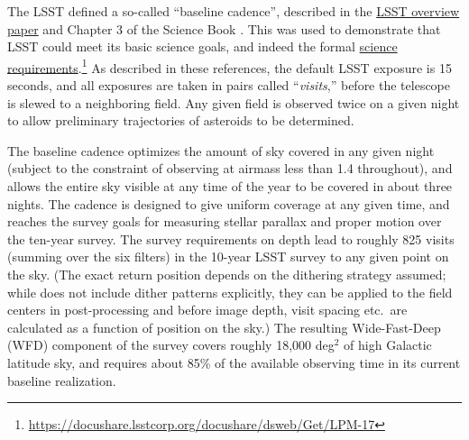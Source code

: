 The LSST defined a so-called ``baseline cadence'', described in the
\href{http://adsabs.harvard.edu/abs/2008arXiv0805.2366I}{LSST overview
paper} \citep{IvezicEtal2008} and Chapter 3 of the Science Book \citep{2009arXiv0912.0201L}.  This was used
to demonstrate that LSST could meet its basic science goals, and indeed
the formal
\href{https://docushare.lsstcorp.org/docushare/dsweb/Get/LPM-17}{science
requirements}.\footnote{\url{https://docushare.lsstcorp.org/docushare/dsweb/Get/LPM-17}}    As described in these references, the default LSST
exposure is 15 seconds, and all exposures are taken in pairs called  ``{\em visits},'' before the telescope is slewed to a neighboring field.
Any given field is observed twice on a given night to allow
preliminary trajectories of asteroids to be determined.

The baseline cadence optimizes the amount of sky covered in any given
night (subject to the constraint of observing at airmass less than 1.4
throughout), and allows the entire sky visible at any time of the year
to be covered in about three nights.  The cadence is designed to give
uniform coverage at any given time, and reaches the survey goals for
measuring stellar parallax and proper motion over the ten-year survey.
The survey requirements on depth lead to roughly 825 visits (summing
over the six filters) in the 10-year LSST survey to any given point on
the sky.  (The exact return position depends on the dithering strategy assumed; while \OpSim does not include dither patterns explicitly, they can be applied to the field centers in post-processing and before image depth, visit spacing etc.\ are calculated as a function of position on the sky.) The resulting Wide-Fast-Deep (WFD) component of the survey covers
roughly 18,000 deg$^2$ of high Galactic latitude sky, and requires about
85\% of the available observing time in its current baseline realization.

